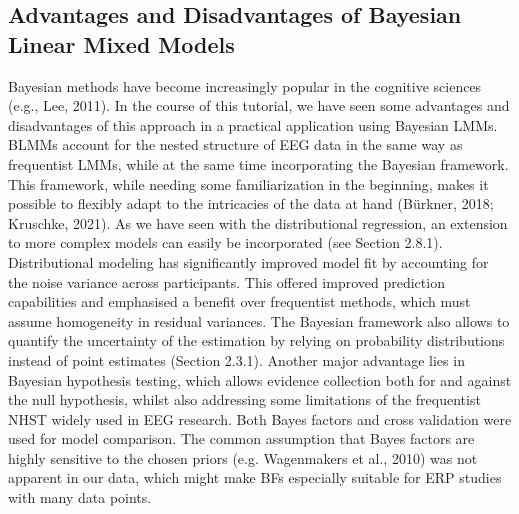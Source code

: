 \documentclass[
  doc,12pt,floatsintext]{apa7}
\begin{document}
\subsection{Advantages and Disadvantages of Bayesian Linear Mixed Models}\label{advantages-and-disadvantages-of-bayesian-linear-mixed-models}

Bayesian methods have become increasingly popular in the cognitive sciences (e.g., Lee, 2011). In the course of this tutorial, we have seen some advantages and disadvantages of this approach in a practical application using Bayesian LMMs. BLMMs account for the nested structure of EEG data in the same way as frequentist LMMs, while at the same time incorporating the Bayesian framework. This framework, while needing some familiarization in the beginning, makes it possible to flexibly adapt to the intricacies of the data at hand (Bürkner, 2018; Kruschke, 2021). As we have seen with the distributional regression, an extension to more complex models can easily be incorporated (see Section 2.8.1). Distributional modeling has significantly improved model fit by accounting for the noise variance across participants. This offered improved prediction capabilities and emphasised a benefit over frequentist methods, which must assume homogeneity in residual variances. The Bayesian framework also allows to quantify the uncertainty of the estimation by relying on probability distributions instead of point estimates (Section 2.3.1). Another major advantage lies in Bayesian hypothesis testing, which allows evidence collection both for and against the null hypothesis, whilst also addressing some limitations of the frequentist NHST widely used in EEG research. Both Bayes factors and cross validation were used for model comparison. The common assumption that Bayes factors are highly sensitive to the chosen priors (e.g. Wagenmakers et al., 2010) was not apparent in our data, which might make BFs especially suitable for ERP studies with many data points.
\end{document}
